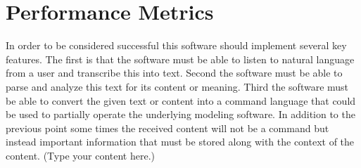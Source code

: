 \documentclass[onecolumn, draftclsnofoot,10pt, compsoc]{IEEEtran}
\begin{document}
\section{Performance Metrics}
In order to be considered successful this software should implement several key features.
The first is that the software must be able to listen to natural language from a user and transcribe this into text.
Second the software must be able to parse and analyze this text for its content or meaning.
Third the software must be able to convert the given text or content into a command language that could be used to partially operate the underlying modeling software.
In addition to the previous point some times the received content will not be a command but instead important information that must be stored along with the context of the content.
(Type your content here.)
\end{document}
